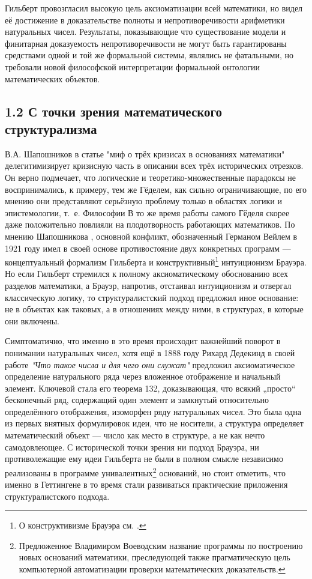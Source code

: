 \documentclass[14pt]{extarticle}
\begin{document}
	Гильберт провозгласил высокую цель аксиоматизации всей математики, но видел её достижение в доказательстве полноты и непротиворечивости арифметики натуральных чисел. Результаты, показывающие что существование модели и финитарная доказуемость непротиворечивости не могут быть гарантированы средствами одной и той же формальной системы, являлись не фатальными, но требовали новой философской интерпретации формальной онтологии математических объектов.
	
	\subsection*{1.2 С точки зрения математического структурализма}
	
	В.А. Шапошников в статье "миф о трёх кризисах в основаниях математики" делегитимизирует кризисную часть в описании всех трёх исторических отрезков. Он верно подмечает, что логические и теоретико-множественные парадоксы не воспринимались, к примеру, тем же Гёделем, как сильно ограничивающие, по его мнению они представляют серьёзную проблему только в областях логики и эпистемологии, т. е. Философии \cite[180]{Godel1947} В то же время работы самого Гёделя скорее даже положительно повлияли на плодотворность работающих математиков. По мнению Шапошникова \cite{shaposhnikov2021}, основной конфликт, обозначенный Германом Вейлем в 1921 году имел в своей основе противостояние двух конкретных программ — концептуальный формализм Гильберта и конструктивный\footnote{О конструктивизме Брауэра см. \cite{BrouwerPosy}.} интуиционизм Брауэра. 
	Но если Гильберт стремился к полному аксиоматическому обоснованию всех разделов математики, а Брауэр, напротив, отстаивал интуиционизм и отвергал классическую логику, то структуралистский подход предложил иное основание: не в объектах как таковых, а в отношениях между ними, в структурах, в которые они включены.
	
	Симптоматично, что именно в это время происходит важнейший поворот в понимании натуральных чисел, хотя ещё в 1888 году Рихард Дедекинд в своей работе \textit{"Что такое числа и для чего они служат"} \cite{Dedekind2015} предложил аксиоматическое определение натурального ряда через вложенное отображение и начальный элемент. Ключевой стала его теорема 132, доказывающая, что всякий „просто“ бесконечный ряд, содержащий один элемент и замкнутый относительно определённого отображения, изоморфен ряду натуральных чисел. Это была одна из первых внятных формулировок идеи, что не носители, а структура определяет математический объект — число как место в структуре, а не как нечто самодовлеющее. С исторической точки зрения ни подход Брауэра, ни противолежащие ему идеи Гильберта не были в полном смысле независимо реализованы в программе унивалентных\footnote{Предложенное Владимиром Воеводским название программы по построению новых оснований математики, преследующей также прагматическую цель компьютерной автоматизации проверки математических доказательств.} оснований, но стоит отметить, что именно в Геттингене в то время стали развиваться практические приложения структуралистского подхода.  
	
\end{document}
